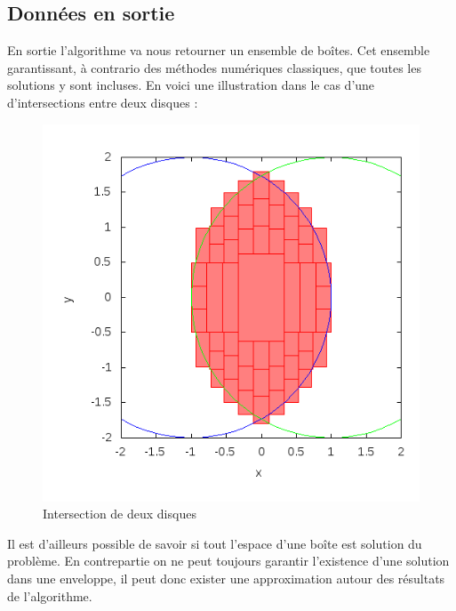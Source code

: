 \subsection{Données en sortie}
En sortie l'algorithme va nous retourner un ensemble de boîtes. Cet ensemble garantissant, à contrario des méthodes numériques classiques, que toutes les solutions y sont incluses. En voici une illustration dans le cas d'une d'intersections entre deux disques : 
\begin{figure}[h] %
  \center
\includegraphics[scale=0.50]{img/disk-disk}
  \caption{Intersection de deux disques} %
 \label{fig:DisqueDisque} %
\end{figure} %

 Il est d'ailleurs possible de savoir si tout l'espace d'une boîte est solution du problème. En contrepartie on ne peut toujours garantir l'existence d'une solution dans une enveloppe, il peut donc exister une approximation autour des résultats de l'algorithme.
